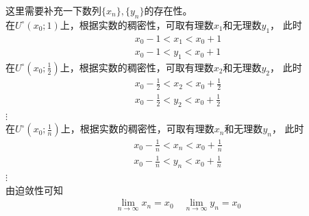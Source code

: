 \documentclass{article}
\begin{document}
这里需要补充一下数列$\{x_n\}, \{y_n\}$的存在性。\\  
在$U^{\circ}(x_0; 1)$上，根据实数的稠密性，可取有理数$x_1$和无理数$y_1$，
此时
\begin{align*}
  x_0 - 1 < x_1 < x_0 + 1 \\
  x_0 - 1 < y_1 < x_0 + 1
\end{align*}
在$U^{\circ}(x_0; \frac{1}{2})$上，根据实数的稠密性，可取有理数$x_2$和无理数$y_2$，
此时
\begin{align*}
  x_0 - \frac{1}{2} < x_2 < x_0 + \frac{1}{2} \\
  x_0 - \frac{1}{2} < y_2 < x_0 + \frac{1}{2} 
\end{align*}
$\vdots$\\
在$U^{\circ}(x_0; \frac{1}{n})$上，根据实数的稠密性，可取有理数$x_n$和无理数$y_n$，
此时
\begin{align*}
  x_0 - \frac{1}{n} < x_n < x_0 + \frac{1}{n} \\
  x_0 - \frac{1}{n} < y_n < x_0 + \frac{1}{n} 
\end{align*}
$\vdots$\\
由迫敛性可知
\begin{align*}
  \lim_{n\to\infty} x_n = x_0 \quad \lim_{n\to\infty} y_n = x_0
\end{align*}
\end{document}

